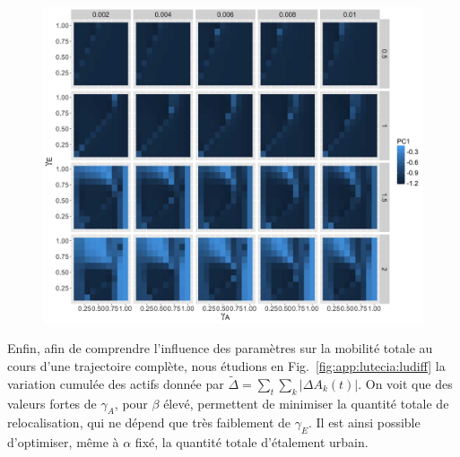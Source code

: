 \begin{figure}
	\includegraphics[width=\linewidth]{Figures/Final/A-lutecia-morphosens.jpg}
\end{figure}



Enfin, afin de comprendre l'influence des paramètres sur la mobilité totale au cours d'une trajectoire complète, nous étudions en Fig.~\ref{fig:app:lutecia:ludiff} la variation cumulée des actifs donnée par $\tilde{\Delta} = \sum_t \sum_k \left|\Delta A_k (t)\right|$. On voit que des valeurs fortes de $\gamma_A$, pour $\beta$ élevé, permettent de minimiser la quantité totale de relocalisation, qui ne dépend que très faiblement de $\gamma_E$. Il est ainsi possible d'optimiser, même à $\alpha$ fixé, la quantité totale d'étalement urbain.


